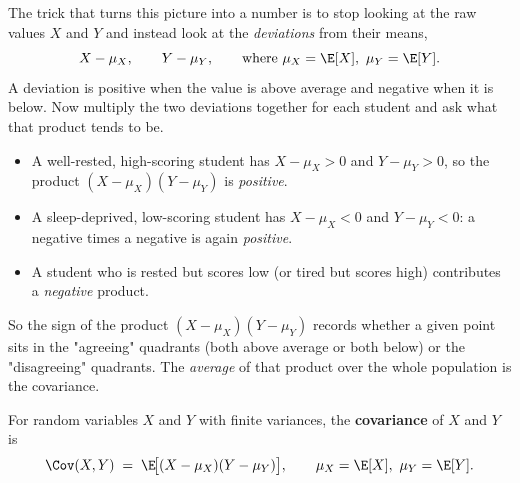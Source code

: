 The trick that turns this picture into a number is to stop looking at the raw values
$X$ and $Y$ and instead look at the \emph{deviations} from their means,
\[
X - \mu_X, \qquad Y - \mu_Y, \qquad \text{where } \mu_X = \E[X],\ \mu_Y = \E[Y].
\]
A deviation is positive when the value is above average and negative when it is
below. Now multiply the two deviations together for each student and ask what that
product tends to be.

\begin{itemize}
\item A well-rested, high-scoring student has $X - \mu_X > 0$ and $Y - \mu_Y > 0$,
so the product $(X-\mu_X)(Y-\mu_Y)$ is \emph{positive}.
\item A sleep-deprived, low-scoring student has $X - \mu_X < 0$ and
$Y - \mu_Y < 0$: a negative times a negative is again \emph{positive}.
\item A student who is rested but scores low (or tired but scores high) contributes
a \emph{negative} product.
\end{itemize}

So the sign of the product $(X-\mu_X)(Y-\mu_Y)$ records whether a given point sits
in the "agreeing" quadrants (both above average or both below) or the "disagreeing"
quadrants. The \emph{average} of that product over the whole population is the
covariance.

\begin{definition}[Covariance]
\label{ch14:def-cov}
For random variables $X$ and $Y$ with finite variances, the \textbf{covariance} of
$X$ and $Y$ is
\[
\Cov(X, Y) \;=\; \E\!\big[(X - \mu_X)(Y - \mu_Y)\big],
\qquad \mu_X = \E[X],\ \mu_Y = \E[Y].
\]
\end{definition}

